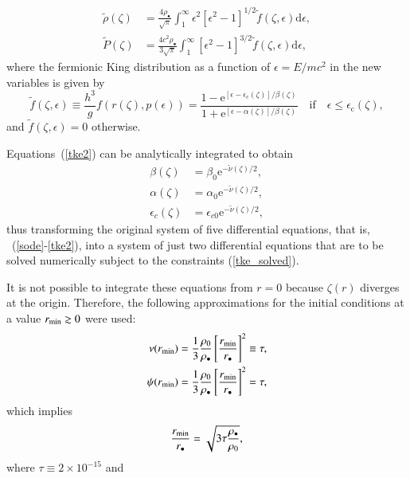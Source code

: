 \documentclass[twocolumn]{aa}
\begin{document}
\begin{appendix}
\begin{align}
    \tilde{\rho}(\zeta)&=\frac{4\rho_{\bullet}}{\sqrt{\pi}}\int^\infty_1\epsilon^2[\epsilon^2-1]^{1/2}\tilde{f}(\zeta,\epsilon)\mathrm{d}\epsilon,\\
   \tilde{P}(\zeta)&=\frac{4c^2\rho_{\bullet}}{3\sqrt{\pi}}\int^\infty_1[\epsilon^2-1]^{3/2}\tilde{f}(\zeta,\epsilon)\mathrm{d}\epsilon,
\end{align}
where the fermionic King distribution as a function of
$\epsilon=E/mc^2$ in the new variables is given by
\begin{equation}
\tilde{f}(\zeta,\epsilon)\equiv \frac{h^3}{g}f(r(\zeta),p(\epsilon))=
      \frac{1-\mathrm {e}^{[\epsilon-\epsilon_\mathrm{c}(\zeta)]/\beta(\zeta)}}
      {1+\mathrm {e}^{[\epsilon-\alpha(\zeta)]/\beta(\zeta)}}\quad\mathrm{if}\quad \epsilon \leq \epsilon_\mathrm{c}(\zeta),
\end{equation}
and $\tilde{f}(\zeta,\epsilon) = 0$ otherwise.

Equations~(\ref{tke2}) can be analytically integrated to obtain
\begin{align}
 \beta(\zeta) &= \beta_0\mathrm{e}^{-\tilde{\nu}(\zeta)/2}, \nonumber\\
 \alpha(\zeta) &= \alpha_0\mathrm{e}^{-\tilde{\nu}(\zeta)/2}, \nonumber\\
 \epsilon_c(\zeta) &= \epsilon_{c0}\mathrm{e}^{-\tilde{\nu}(\zeta)/2},
 \label{tke_solved}
\end{align}
thus transforming the original system of five differential equations, that is, ~(\ref{sode}-\ref{tke2}), into a system of just two differential equations that are to be solved numerically subject to the constraints (\ref{tke_solved}).

It is not possible to integrate these equations from $r=0$ because $\zeta(r)$ diverges at the origin.
Therefore, the following approximations for the initial conditions at a value $r_{\rm{min}}\gtrsim 0$ were used:
\begin{align}
   \nu(r_{\rm{min}}) &= \frac{1}{3}\frac{\rho_0}{\rho_\bullet}\left[\frac{r_{\rm{min}}}{r_\bullet}\right]^2\equiv \tau, \\
   \psi(r_{\rm{min}})&= \frac{1}{3}\frac{\rho_0}{\rho_\bullet}\left[\frac{r_{\rm{min}}}{r_\bullet}\right]^2 = \tau,
\end{align}
which implies
\begin{equation}
   \frac{r_{\rm{min}}}{r_\bullet}=\sqrt{3\tau\frac{\rho_\bullet}{\rho_0}},
\end{equation}
where
$\tau\equiv 2\times10^{-15}$ and


\end{appendix}
\end{document}
